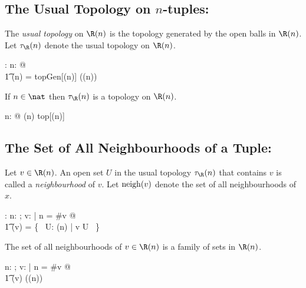\documentclass{amsart}
\begin{document}
\subsection{The Usual Topology on $n$-tuples: }

The \textit{usual topology} on $\Rtup(n)$ is the topology generated by the open balls in $\Rtup(n)$.
Let $\tauRtup(n)$ denote the usual topology on $\Rtup(n)$.

\begin{axdef}
	\tauRtup: \nat \fun \Fam \Rinf
\where
	\forall n: \nat @ \\
	\t1	\tauRtup(n) = topGen[\Rtup(n)] (\ballsRtup(n))
\end{axdef}

\begin{remark}

If $n \in \nat$ then $\tauRtup(n)$ is a topology on $\Rtup(n)$.

\begin{zed}
	\forall n: \nat @ \tauRtup(n) \in top[\Rtup(n)]
\end{zed}
\end{remark}

\subsection{The Set of All Neighbourhoods of a Tuple: }

Let $v \in \Rtup(n)$. 
An open set $U$ in the usual topology $\tauRtup(n)$ that contains $v$
is called a \textit{neighbourhood} of $v$.
Let $\operatorname{neigh}(v)$ denote the set of all neighbourhoods of $x$.

\begin{axdef}
\neighRinf: \Rinf \fun \Fam \Rinf
\where
\forall n: \nat; v: \Rinf | n = \#v @ \\
\t1	\neighRinf(v) = \{~ U: \tauRtup(n) | v \in U ~\}
\end{axdef}

\begin{remark}

The set of all neighbourhoods of $v \in \Rtup(n)$ is a family of sets in $\Rtup(n)$.

\begin{zed}
\forall n: \nat; v: \Rinf | n = \#v @ \\
\t1	\neighRinf(v) \in \Fam (\Rtup(n))
\end{zed}

\end{remark}
\end{document}
